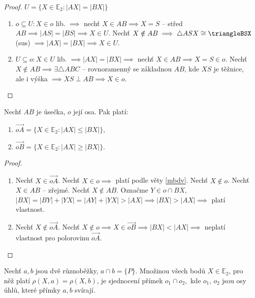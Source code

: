 \begin{proof}
  $U=\{ X\in \mathbb E_2: |AX|=|BX| \}$
  \begin{enumerate}[$i.$]
    \item $o\subseteq U: X\in o$ lib. $\implies$ nechť $X\in AB\implies X=S$ -- střed $AB \implies |AS|=|BS|\implies X\in U.$ Nechť $X\notin AB\implies \triangle ASX \cong\triangleBSX$ (sus) $\implies |AX|=|BX|\implies X\in U$.
    \item $U \subseteq o: X\in U$ lib. $\implies |AX|=|BX|\implies$ nechť $X\in AB\implies X=S\in o.$ Nechť $X\notin AB \implies \exists \triangle ABC$ -- rovnoramenný se základnou $AB$, kde $XS$ je těžnice, ale i výška $\implies XS \perp AB \implies X\in o.$ \qedhere
  \end{enumerate}
\end{proof}

\begin{veta}
  Nechť $AB$ je úsečka, $o$ její osa. Pak platí:
  \begin{enumerate}[$i.$]
    \item $\overrightarrow{oA}=\{ X\in \mathbb E_2:|AX|\leq |BX| \},$
    \item $\overrightarrow{oB}=\{ X \in \mathbb E_2 : |AX| \geq |BX| \}.$
  \end{enumerate}
\end{veta}

\begin{proof}
  \begin{enumerate}[$i.$]
    \item Nechť $X\in \overrightarrow{oA}$. Nechť $X\in o\implies$ platí podle věty \ref{mbdv}. Nechť $X\notin o$. Nechť $X\in AB$ -- zřejmé. Nechť $X\notin AB$. Označme $Y\in o \cap BX$, $|BX|=|BY|+|YX|=|AY|+|YX|>|AX|\implies |BX|>|AX|\implies$ platí vlastnost.
    \item Nechť $X\notin \overrightarrow{oA}$. Nechť $X\notin o \implies X\in \overrightarrow{oB}\implies |BX|<|AX|\implies$ neplatí vlastnost pro polorovinu $\overrightarrow{oA}.$ \qedhere
\end{enumerate}
\end{proof}

\begin{veta}
  Nechť $a,b$ jsou dvě různoběžky, $a\cap b = \{P\}.$ Množinou všech bodů $X\in \mathbb E_2$, pro něž platí $\rho(X,a)=\rho(X,b)$, je sjednocení přímek $o_1\cap o_2,$ kde  $o_1$, $o_2$ jsou osy úhlů, které přímky $a,b$ svírají.
\end{veta}


